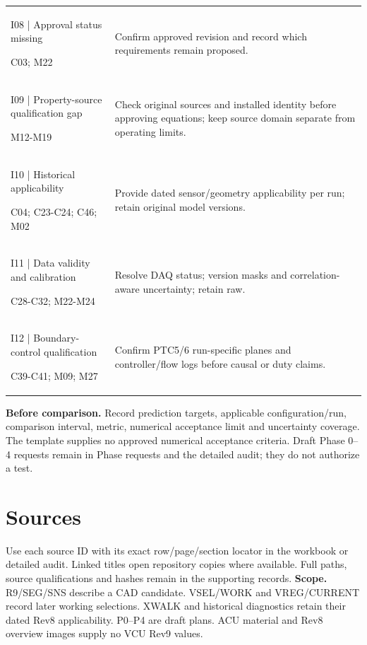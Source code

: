 \documentclass[11pt]{article}
\begin{document}
\begin{longtable}{>{\raggedright\arraybackslash}p{}>{\raggedright\arraybackslash}p{}}
I08 | Approval status missing\par C03; M22 & Confirm approved revision and record which requirements remain proposed.\\[4pt]
I09 | Property-source qualification gap\par M12-M19 & Check original sources and installed identity before approving equations; keep source domain separate from operating limits.\\[4pt]
I10 | Historical applicability\par C04; C23-C24; C46; M02 & Provide dated sensor/geometry applicability per run; retain original model versions.\\[4pt]
I11 | Data validity and calibration\par C28-C32; M22-M24 & Resolve DAQ status; version masks and correlation-aware uncertainty; retain raw.\\[4pt]
I12 | Boundary-control qualification\par C39-C41; M09; M27 & Confirm PTC5/6 run-specific planes and controller/flow logs before causal or duty claims.\\[4pt]
\bottomrule\end{longtable}\endgroup
\textbf{Before comparison.} Record prediction targets, applicable configuration/run, comparison interval, metric, numerical acceptance limit and uncertainty coverage. The template supplies no approved numerical acceptance criteria. Draft Phase 0--4 requests remain in Phase requests and the detailed audit; they do not authorize a test.
\clearpage\section{Sources}\label{sources-detail}
Use each source ID with its exact row/page/section locator in the workbook or detailed audit. Linked titles open repository copies where available. Full paths, source qualifications and hashes remain in the supporting records.
\textbf{Scope.} R9/SEG/SNS describe a CAD candidate. VSEL/WORK and VREG/CURRENT record later working selections. XWALK and historical diagnostics retain their dated Rev8 applicability. P0--P4 are draft plans. ACU material and Rev8 overview images supply no VCU Rev9 values.
\begingroup\small\setlength{\tabcolsep}{4pt}
\end{document}
